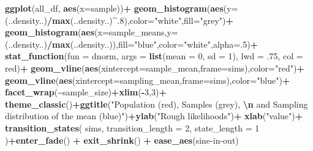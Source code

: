 \documentclass[
]{book}
\newenvironment{Shaded}{\begin{snugshade}}{\end{snugshade}}
\newcommand{\AttributeTok}[1]{\textcolor[rgb]{0.13,0.29,0.53}{#1}}
\newcommand{\DecValTok}[1]{\textcolor[rgb]{0.00,0.00,0.81}{#1}}
\newcommand{\FunctionTok}[1]{\textcolor[rgb]{0.13,0.29,0.53}{\textbf{#1}}}
\newcommand{\NormalTok}[1]{#1}
\newcommand{\SpecialCharTok}[1]{\textcolor[rgb]{0.81,0.36,0.00}{\textbf{#1}}}
\newcommand{\StringTok}[1]{\textcolor[rgb]{0.31,0.60,0.02}{#1}}
\begin{document}
\begin{Shaded}
\begin{Highlighting}[]
\FunctionTok{ggplot}\NormalTok{(all\_df, }\FunctionTok{aes}\NormalTok{(}\AttributeTok{x=}\NormalTok{sample))}\SpecialCharTok{+}
  \FunctionTok{geom\_histogram}\NormalTok{(}\FunctionTok{aes}\NormalTok{(}\AttributeTok{y=}\NormalTok{(..density..)}\SpecialCharTok{/}\FunctionTok{max}\NormalTok{(..density..)}\SpecialCharTok{\^{}}\NormalTok{.}\DecValTok{8}\NormalTok{),}\AttributeTok{color=}\StringTok{"white"}\NormalTok{,}\AttributeTok{fill=}\StringTok{"grey"}\NormalTok{)}\SpecialCharTok{+}
  \FunctionTok{geom\_histogram}\NormalTok{(}\FunctionTok{aes}\NormalTok{(}\AttributeTok{x=}\NormalTok{sample\_means,}\AttributeTok{y=}\NormalTok{(..density..)}\SpecialCharTok{/}\FunctionTok{max}\NormalTok{(..density..)),}\AttributeTok{fill=}\StringTok{"blue"}\NormalTok{,}\AttributeTok{color=}\StringTok{"white"}\NormalTok{,}\AttributeTok{alpha=}\NormalTok{.}\DecValTok{5}\NormalTok{)}\SpecialCharTok{+}
  \FunctionTok{stat\_function}\NormalTok{(}\AttributeTok{fun =}\NormalTok{ dnorm, }
                \AttributeTok{args =} \FunctionTok{list}\NormalTok{(}\AttributeTok{mean =} \DecValTok{0}\NormalTok{, }\AttributeTok{sd =} \DecValTok{1}\NormalTok{), }
                \AttributeTok{lwd =}\NormalTok{ .}\DecValTok{75}\NormalTok{, }
                \AttributeTok{col =} \StringTok{\textquotesingle{}red\textquotesingle{}}\NormalTok{)}\SpecialCharTok{+}
  \FunctionTok{geom\_vline}\NormalTok{(}\FunctionTok{aes}\NormalTok{(}\AttributeTok{xintercept=}\NormalTok{sample\_mean,}\AttributeTok{frame=}\NormalTok{sims),}\AttributeTok{color=}\StringTok{"red"}\NormalTok{)}\SpecialCharTok{+}
  \FunctionTok{geom\_vline}\NormalTok{(}\FunctionTok{aes}\NormalTok{(}\AttributeTok{xintercept=}\NormalTok{sampling\_mean,}\AttributeTok{frame=}\NormalTok{sims),}\AttributeTok{color=}\StringTok{"blue"}\NormalTok{)}\SpecialCharTok{+}
  \FunctionTok{facet\_wrap}\NormalTok{(}\SpecialCharTok{\textasciitilde{}}\NormalTok{sample\_size)}\SpecialCharTok{+}\FunctionTok{xlim}\NormalTok{(}\SpecialCharTok{{-}}\DecValTok{3}\NormalTok{,}\DecValTok{3}\NormalTok{)}\SpecialCharTok{+}
  \FunctionTok{theme\_classic}\NormalTok{()}\SpecialCharTok{+}\FunctionTok{ggtitle}\NormalTok{(}\StringTok{"Population (red), Samples (grey), }\SpecialCharTok{\textbackslash{}n}\StringTok{ and Sampling distribution of the mean (blue)"}\NormalTok{)}\SpecialCharTok{+}\FunctionTok{ylab}\NormalTok{(}\StringTok{"Rough likelihoods"}\NormalTok{)}\SpecialCharTok{+}
  \FunctionTok{xlab}\NormalTok{(}\StringTok{"value"}\NormalTok{)}\SpecialCharTok{+}
  \FunctionTok{transition\_states}\NormalTok{(}
\NormalTok{    sims,}
    \AttributeTok{transition\_length =} \DecValTok{2}\NormalTok{,}
    \AttributeTok{state\_length =} \DecValTok{1}
\NormalTok{  )}\SpecialCharTok{+}\FunctionTok{enter\_fade}\NormalTok{() }\SpecialCharTok{+} 
  \FunctionTok{exit\_shrink}\NormalTok{() }\SpecialCharTok{+}
  \FunctionTok{ease\_aes}\NormalTok{(}\StringTok{\textquotesingle{}sine{-}in{-}out\textquotesingle{}}\NormalTok{)}
\end{Highlighting}
\end{Shaded}
\end{document}
